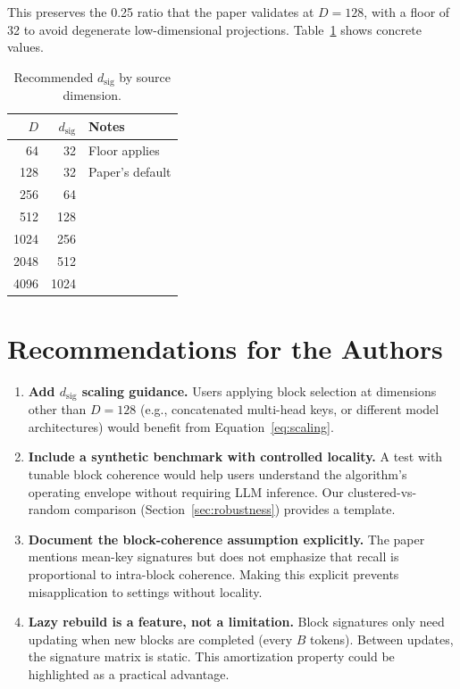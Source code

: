 \documentclass[11pt]{article}
\begin{document}
This preserves the 0.25 ratio that the paper validates at $D = 128$, with a floor of 32 to avoid degenerate low-dimensional projections. Table~\ref{tab:scaling} shows concrete values.

\begin{table}[htbp]
    \centering
    \caption{Recommended $d_\text{sig}$ by source dimension.}
    \label{tab:scaling}
    \begin{tabular}{rrl}
        \toprule
        $D$ & $d_\text{sig}$ & Notes \\
        \midrule
        64 & 32 & Floor applies \\
        128 & 32 & Paper's default \\
        256 & 64 & \\
        512 & 128 & \\
        1024 & 256 & \\
        2048 & 512 & \\
        4096 & 1024 & \\
        \bottomrule
    \end{tabular}
\end{table}

\section{Recommendations for the Authors}

\begin{enumerate}
    \item \textbf{Add $d_\text{sig}$ scaling guidance.} Users applying block selection at dimensions other than $D = 128$ (e.g., concatenated multi-head keys, or different model architectures) would benefit from Equation~\ref{eq:scaling}.
    
    \item \textbf{Include a synthetic benchmark with controlled locality.} A test with tunable block coherence would help users understand the algorithm's operating envelope without requiring LLM inference. Our clustered-vs-random comparison (Section~\ref{sec:robustness}) provides a template.
    
    \item \textbf{Document the block-coherence assumption explicitly.} The paper mentions mean-key signatures but does not emphasize that recall is proportional to intra-block coherence. Making this explicit prevents misapplication to settings without locality.
    
    \item \textbf{Lazy rebuild is a feature, not a limitation.} Block signatures only need updating when new blocks are completed (every $B$ tokens). Between updates, the signature matrix is static. This amortization property could be highlighted as a practical advantage.
\end{enumerate}
\end{document}
